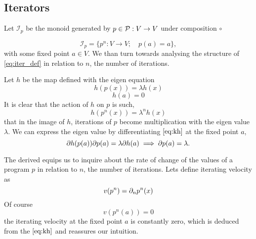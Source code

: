  \subsection{Iterators}
  

Let $\mathcal{I}_p$ be the monoid generated by $p\in\mathcal{P}:V\to V$ under composition $\circ$
  
  \begin{equation}\label{eq:iter_def}
  \mathcal{I}_p=\{p^n:V\to V;\quad p(a)=a\},
  \end{equation}
 with some fixed point $a\in V$. We than turn towards analysing the structure of \eqref{eq:iter_def} in relation to $n$, the number of iterations.

Let $h$ be the map defined with the eigen equation \cite{CompoOper}
  \begin{equation}\label{eq:kh}
  h(p(x))=\lambda h(x)
  \end{equation}
   \begin{equation}
   h(a)=0
   \end{equation}
It is clear that the action of $h$ on $p$ is such, 
  \begin{equation}
  h(p^n(x))=\lambda^nh(x)
  \end{equation}
that in the image of $h$, iterations of $p$ become multiplication with the eigen value $\lambda$. We can express the eigen value by differentiating $\eqref{eq:kh}$ at the fixed point $a$,
$$\partial h(p(a))\partial p(a)=\lambda\partial h(a)\implies\partial p(a)=\lambda.$$

The derived equips us to inquire about the rate of change of the values of a program $p$ in relation to $n$, the number of iterations. Lets define iterating velocity as
  \begin{equation}
  v(p^n)=\partial_np^n(x)
  \end{equation}
Of course
  \begin{equation}
  v(p^n(a))=0
  \end{equation}
the iterating velocity at the fixed point $a$ is constantly zero, which is deduced from the $\eqref{eq:kh}$ and reassures our intuition.


